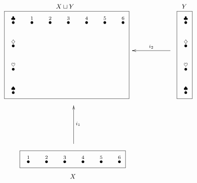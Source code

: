 \documentclass[a4paper]{book}
\newcommand{\LMO}[1]{\stackrel{#1}{\bullet}}
\theoremstyle{myth}
\newtheorem{exampleENG}[envENG]{\begin{english}Example\end{english}}
\begin{document}
\begin{russian}
\begin{exampleENG}\label{ex:coprod of dots}
\begin{align}
\parbox{2.4in}{\begin{center}\small $X\sqcup Y$\vspace{-.1in}\end{center}\fbox{
\xymatrix@=15pt{
\LMO{\clubsuit}&\LMO{1}&\LMO{2}&\LMO{3}&\LMO{4}&\LMO{5}&\LMO{6}\\\LMO{\diamondsuit}\\\LMO{\heartsuit}\\\LMO{\spadesuit}
}}}
\parbox{.9in}{
\xymatrix{~&&\ar[ll]_{i_2}~}
}
\parbox{.3in}{\begin{center}\small $Y$\vspace{-.1in}\end{center}\fbox{
\xymatrix@=15pt{
\LMO{\clubsuit}\\\LMO{\diamondsuit}\\\LMO{\heartsuit}\\\LMO{\spadesuit}
}}}
\\\nonumber
\parbox{1in}{\hspace{-1.4in}\xymatrix{~\\\\\ar[uu]_{i_1}}}
\\\nonumber
\parbox{2.1in}{\hspace{-1.3in}\fbox{
\xymatrix@=15pt{
\LMO{1}&\LMO{2}&\LMO{3}&\LMO{4}&\LMO{5}&\LMO{6}
}}\begin{center}\hspace{-2.6in}\small$X$\end{center}}
\end{align}
\end{exampleENG}


\end{russian}
\end{document}
